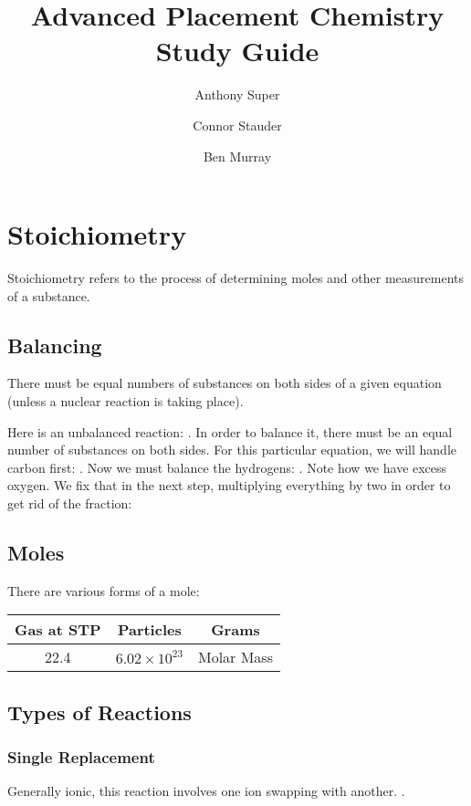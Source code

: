 \documentclass[]{article}
\begin{document}
\title{Advanced Placement Chemistry Study Guide}
\author{Anthony Super \and Connor Stauder \and Ben Murray}
\maketitle
\tableofcontents
\section{Stoichiometry}
Stoichiometry refers to the process of determining moles and other measurements of a substance.

\subsection{Balancing}
There must be equal numbers of substances on both sides of a given equation (unless a nuclear reaction is taking place). 

Here is an unbalanced reaction:
.
In order to balance it, there must be an equal number of substances on both sides. For this particular equation, we will handle carbon first:
. Now we must balance the hydrogens: . Note how we have excess oxygen. We fix that in the next step, multiplying everything by two in order to get rid of the fraction: 

\subsection{Moles}

There are various forms of a mole:

\begin{tabular}{| c | c | c|}
\hline
Gas at STP & Particles & Grams \\
\hline
22.4 & $ 6.02 \times 10^{23} $ & Molar Mass \\ 
\hline
\end{tabular}

\subsection{Types of Reactions}
\subsubsection{Single Replacement}
Generally ionic, this reaction involves one ion swapping with another. . 
\end{document}
